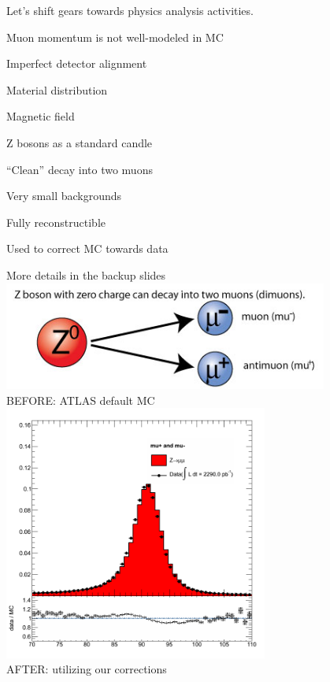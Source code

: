 {
  Let's shift gears towards physics analysis activities.
}

{
\colb[T]
\centering
\iteb
\item Muon momentum is not well-modeled in MC
\iteb
\item Imperfect detector alignment
\item Material distribution
\item Magnetic field
\itee
\item Z bosons as a standard candle
\iteb
\item ``Clean'' decay into two muons
\item Very small backgrounds
\item Fully reconstructible
\item Used to correct MC towards data
\itee
\item More details in the backup slides
\itee
\includegraphics[width=0.8\textwidth]{dates/mtg/figures/mcp/z0decay} \\
\centering
\tiny{BEFORE: ATLAS default MC}\\
\includegraphics[width=0.65\textwidth]{dates/mtg/figures/mcp/KC_old} \\
\tiny{AFTER: utilizing our corrections}\\
}
